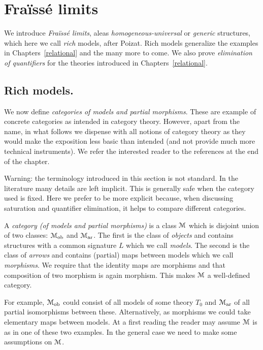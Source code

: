 \documentclass[creche.tex]{subfiles}
\begin{document}
\chapter{Fra\"iss\'e limits}
\label{fraisse}

\def\ceq#1#2#3{\parbox[b]{20ex}{$\displaystyle #1$}\parbox[b]{4ex}{\hfil$#2$}$\displaystyle #3$}

We introduce \textit{Fra\"iss\'e limits}, aleas \textit{homogeneous-universal\/} or \textit{generic\/} structures, which here we call \textit{rich\/} models, after Poizat. Rich models generalize the examples in Chapters~\ref{relational} and the many more to come. We also prove \textit{elimination of quantifiers\/} for the theories introduced in Chapters~\ref{relational}.

\section{Rich models.}\label{rich}
We now define \textit{categories of models and partial morphisms}. These are example of concrete categories as intended in category theory. However, apart from the name, in what follows we dispense with all notions of category theory as they would make the exposition less basic than intended (and not provide much more technical instruments). We refer the interested reader to the references at the end of the chapter.

\noindent\llap{\textcolor{red}{\Large\danger}\kern1.5ex}Warning: the terminology introduced in this section is not standard. In the literature many details are left implicit. This is generally safe when the category used is fixed. Here we prefer to be more explicit because, when discussing saturation and quantifier elimination, it helps to compare different categories.

A \emph{category (of models and partial morphisms)\/} is a class $\EuScript M$ which is disjoint union of two classes: \emph{$\EuScript M_{\textrm{ob}}$} and \emph{$\EuScript M_{\textrm{ar}}$}. The first is the class of \emph{objects\/} and contains structures with a common signature $L$ which we call \emph{models}. The second is the class of \emph{arrows\/} and contains (partial) maps between models which we call \emph{morphisms}. We require that the identity maps are morphisms and that composition of two morphism is again morphism. This makes $\EuScript M$ a well-defined category. 

For example, $\EuScript M_{\rm ob}$ could consist of all models of some theory $T_0$ and $\EuScript M_{\rm ar}$ of all partial isomorphisms between these. Alternatively, as morphisms we could take elementary maps between models. At a first reading the reader may assume $\EuScript M$ is as in one of these two examples. In the general case we need to make some assumptions on $\EuScript M$.
\end{document}
